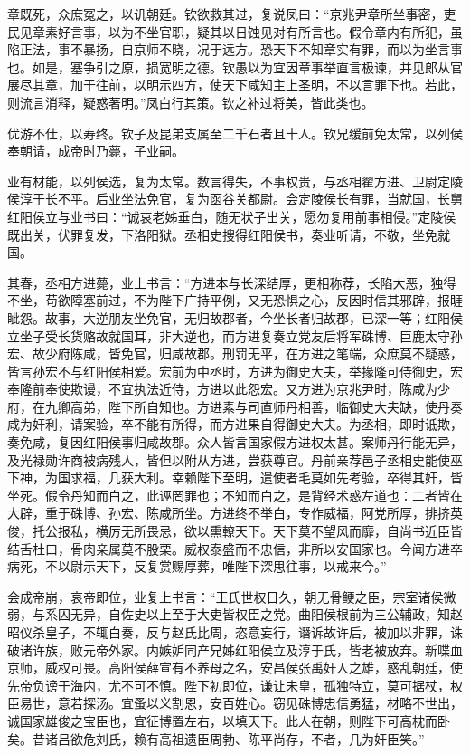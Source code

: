 \documentclass[12pt,UTF8]{ctexbook}
\begin{document}
章既死，众庶冤之，以讥朝廷。钦欲救其过，复说凤曰：“京兆尹章所坐事密，吏民见章素好言事，以为不坐官职，疑其以日蚀见对有所言也。假令章内有所犯，虽陷正法，事不暴扬，自京师不晓，况于远方。恐天下不知章实有罪，而以为坐言事也。如是，塞争引之原，损宽明之德。钦愚以为宜因章事举直言极谏，并见郎从官展尽其章，加于往前，以明示四方，使天下咸知主上圣明，不以言罪下也。若此，则流言消释，疑惑著明。”凤白行其策。钦之补过将美，皆此类也。



优游不仕，以寿终。钦子及昆弟支属至二千石者且十人。钦兄缓前免太常，以列侯奉朝请，成帝时乃薨，子业嗣。



业有材能，以列侯选，复为太常。数言得失，不事权贵，与丞相翟方进、卫尉定陵侯淳于长不平。后业坐法免官，复为函谷关都尉。会定陵侯长有罪，当就国，长舅红阳侯立与业书曰：“诚哀老姊垂白，随无状子出关，愿勿复用前事相侵。”定陵侯既出关，伏罪复发，下洛阳狱。丞相史搜得红阳侯书，奏业听请，不敬，坐免就国。



其春，丞相方进薨，业上书言：“方进本与长深结厚，更相称荐，长陷大恶，独得不坐，苟欲障塞前过，不为陛下广持平例，又无恐惧之心，反因时信其邪辟，报睚眦怨。故事，大逆朋友坐免官，无归故郡者，今坐长者归故郡，已深一等；红阳侯立坐子受长货赂故就国耳，非大逆也，而方进复奏立党友后将军硃博、巨鹿太守孙宏、故少府陈咸，皆免官，归咸故郡。刑罚无平，在方进之笔端，众庶莫不疑惑，皆言孙宏不与红阳侯相爱。宏前为中丞时，方进为御史大夫，举掾隆可侍御史，宏奉隆前奉使欺谩，不宜执法近侍，方进以此怨宏。又方进为京兆尹时，陈咸为少府，在九卿高弟，陛下所自知也。方进素与司直师丹相善，临御史大夫缺，使丹奏咸为奸利，请案验，卒不能有所得，而方进果自得御史大夫。为丞相，即时诋欺，奏免咸，复因红阳侯事归咸故郡。众人皆言国家假方进权太甚。案师丹行能无异，及光禄勋许商被病残人，皆但以附从方进，尝获尊官。丹前亲荐邑子丞相史能使巫下神，为国求福，几获大利。幸赖陛下至明，遣使者毛莫如先考验，卒得其奸，皆坐死。假令丹知而白之，此诬罔罪也；不知而白之，是背经术惑左道也：二者皆在大辟，重于硃博、孙宏、陈咸所坐。方进终不举白，专作威福，阿党所厚，排挤英俊，托公报私，横厉无所畏忌，欲以熏轑天下。天下莫不望风而靡，自尚书近臣皆结舌杜口，骨肉亲属莫不股栗。威权泰盛而不忠信，非所以安国家也。今闻方进卒病死，不以尉示天下，反复赏赐厚葬，唯陛下深思往事，以戒来今。”



会成帝崩，哀帝即位，业复上书言：“王氏世权日久，朝无骨鲠之臣，宗室诸侯微弱，与系囚无异，自佐史以上至于大吏皆权臣之党。曲阳侯根前为三公辅政，知赵昭仪杀皇子，不辄白奏，反与赵氏比周，恣意妄行，谮诉故许后，被加以非罪，诛破诸许族，败元帝外家。内嫉妒同产兄姊红阳侯立及淳于氏，皆老被放弃。新喋血京师，威权可畏。高阳侯薛宣有不养母之名，安昌侯张禹奸人之雄，惑乱朝廷，使先帝负谤于海内，尤不可不慎。陛下初即位，谦让未皇，孤独特立，莫可据杖，权臣易世，意若探汤。宜蚤以义割恩，安百姓心。窃见硃博忠信勇猛，材略不世出，诚国家雄俊之宝臣也，宜征博置左右，以填天下。此人在朝，则陛下可高枕而卧矣。昔诸吕欲危刘氏，赖有高祖遗臣周勃、陈平尚存，不者，几为奸臣笑。”
\end{document}
